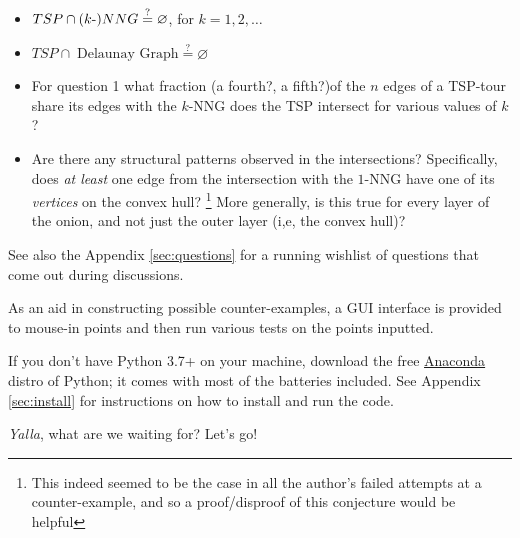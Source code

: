 \begin{description}
     \begin{itemize}
     \item $TSP \cap (k{\text -})NNG \stackrel{?}{=} \varnothing$, for $k=1,2,\ldots$
     \item $TSP \cap \; \text{Delaunay Graph} \stackrel{?}{=} \varnothing$
     \item For question 1 what fraction (a fourth?, a fifth?)of the $n$ edges of a TSP-tour share its edges with the  $k$-NNG does the TSP intersect for various values of $k$? 
     \item Are there any structural patterns observed in the intersections? Specifically, does \textit{at least } 
           one edge from the intersection with the $1$-NNG have one of its \textit{vertices} on the convex hull? 
           \footnote{This indeed seemed to be the case in all the author's failed attempts at a counter-example, and so a proof/disproof of this conjecture would be helpful}
           More generally, is this true for every layer of the onion, and not just the outer layer (i,e, the convex hull)?
     \end{itemize}

     See also the Appendix \autoref{sec:questions} for a running wishlist of questions that come out during discussions. 

     As an aid in constructing possible counter-examples, a GUI interface is provided to mouse-in points and then 
     run various tests on the points inputted. 
     
     If you don't have  Python 3.7+ on your machine, download the free  \href{https://www.anaconda.com/products/individual}{Anaconda} distro of Python; 
     it comes with most of the batteries included. See Appendix \autoref{sec:install} for instructions on how to install and run the code. 

     \textit{Yalla}, what are we waiting for? Let's go!

\end{description}
